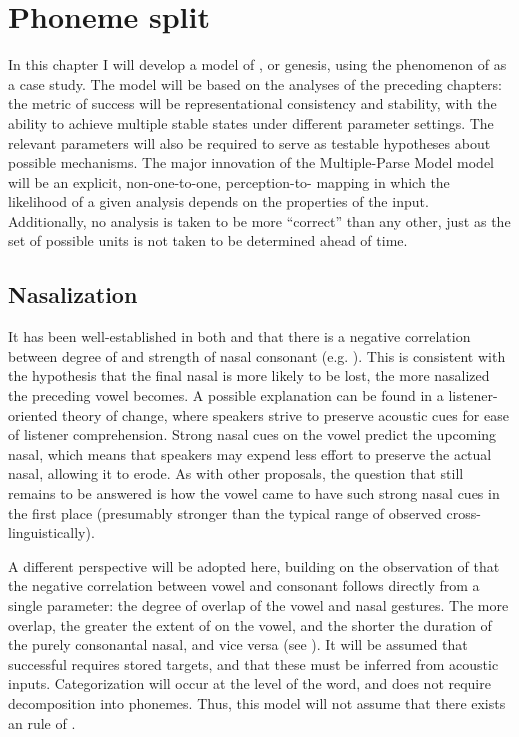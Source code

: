 \chapter{Phoneme split}\label{ch:Phoneme-Split}

In this chapter I will develop a model of , or genesis,
using the phenomenon of  as a case study. The model
will be based on the analyses of the preceding chapters: the metric
of success will be representational consistency and stability, with
the ability to achieve multiple stable states under different parameter
settings. The relevant parameters will also be required to serve as
testable hypotheses about possible  mechanisms. 
The major innovation of the Multiple-Parse Model model will be an explicit,
non-one-to-one, perception-to- mapping in which the likelihood
of a given analysis depends on the  properties of the input.
Additionally, no analysis is taken to be more ``correct'' than any other,
just as the set of possible  units is not taken to be determined
ahead of time.

\section{Nasalization}\largerpage
It has been well-established in both  and  that
there is a negative correlation between degree of  and strength
of nasal consonant (e.g. \citealt{kawasaki1978perceived,cohn1990phonetic}).
This is consistent with the hypothesis that the final nasal is more
likely to be lost, the more nasalized the preceding vowel becomes.
A possible explanation can be found in a listener-oriented theory
of change, where speakers strive to preserve acoustic cues for ease
of listener comprehension. Strong nasal cues on the vowel predict
the upcoming nasal, which means that speakers may expend less effort
to preserve the actual nasal, allowing it to erode. As with other
proposals, the question that still remains to be answered is how the
vowel came to have such strong nasal cues in the first place (presumably
stronger than the typical range of   observed
cross-linguistically). 

A different perspective will be adopted here, building on the observation
of \citet{Beddor2009} that the negative correlation between vowel
 and consonant  follows directly from a single 
parameter: the degree of overlap of the vowel and nasal gestures.
The more overlap, the greater the extent of  on the vowel,
and the shorter the duration of the purely consonantal nasal, and
vice versa (see ). It will be assumed
that successful  requires stored  targets, and
that these must be inferred from acoustic inputs. Categorization will occur at the level
of the word, and does not require decomposition into phonemes. Thus,
this model will not assume that there exists an  rule
of . 

